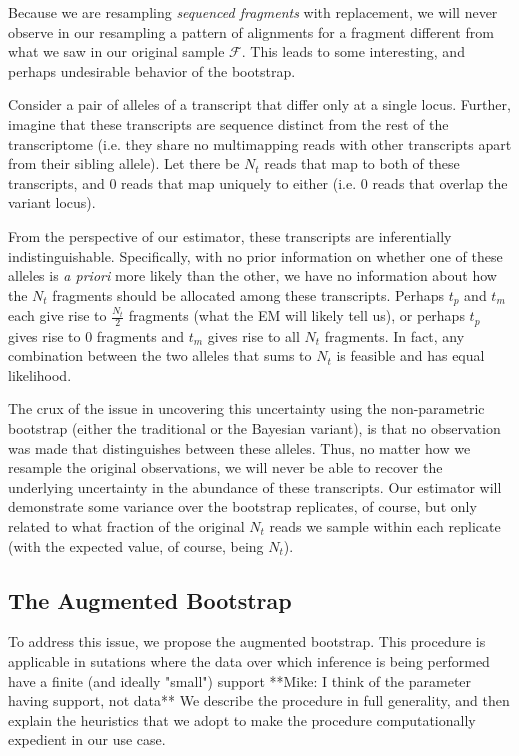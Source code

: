 Because we are resampling \textit{sequenced fragments} with replacement, we will never observe in our 
resampling a pattern of alignments for a fragment different from what we saw in our original sample 
$\mathcal{F}$. This leads to some interesting, and perhaps undesirable behavior of the bootstrap. 

Consider a pair of alleles of a transcript that differ only at a single locus.  Further, imagine 
that these transcripts are sequence distinct from the rest of the transcriptome (i.e. they share no 
multimapping reads with other transcripts apart from their sibling allele).  Let there be $N_t$ 
reads that map to both of these transcripts, and $0$ reads that map uniquely to either (i.e. 0 
reads that overlap the variant locus).

From the perspective of our estimator, these transcripts are inferentially indistinguishable.  
Specifically, with no prior information on whether one of these alleles is \textit{a priori} more likely 
than the other, we have no information about how the $N_t$ fragments should be allocated among 
these transcripts.  Perhaps $t_p$ and $t_m$ each give rise to $\frac{N_t}{2}$ fragments (what the 
EM will likely tell us), or perhaps $t_p$ gives rise to 0 fragments and $t_m$ gives rise to all 
$N_t$ fragments.  In fact, any combination between the two alleles that sums to $N_t$ is feasible 
and has equal likelihood.

The crux of the issue in uncovering this uncertainty using the non-parametric bootstrap (either the 
traditional or the Bayesian variant), is that no observation was made that distinguishes between 
these alleles.  Thus, no matter how we resample the original observations, we will never be able 
to recover the underlying uncertainty in the abundance of these transcripts.  Our estimator will 
demonstrate some variance over the bootstrap replicates, of course, but only related to what 
fraction of the original $N_t$ reads we sample within each replicate (with the expected value, 
of course, being $N_t$).

\subsection{The Augmented Bootstrap}

To address this issue, we propose the augmented bootstrap.  This procedure is applicable in 
sutations where the data over which inference is being performed have a finite (and ideally "small") 
support **Mike: I think of the parameter having support, not data**  We describe the procedure in 
full generality, and then explain the heuristics that we adopt to make the procedure computationally 
expedient in our use case.


